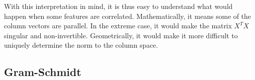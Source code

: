 With this interpretation in mind, it is thus easy to understand what would happen when some features are correlated. Mathematically, it means some of the column vectors are parallel. In the extreme case, it would make the matrix $X^TX$ singular and non-invertible. Geometrically, it would make it more difficult to uniquely determine the norm to the column space.
\subsection{Gram-Schmidt}


